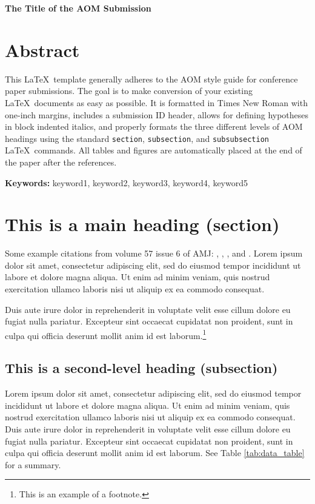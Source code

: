 \documentclass[12pt,letterpaper]{article}
\renewcommand{\title}[1]{
  	\centerline{\textbf{#1}}
  }
\begin{document}
\title{The Title of the AOM Submission}

\section{Abstract}
This \LaTeX\ template generally adheres to the AOM style guide for conference paper submissions. The goal is to make conversion of your existing \LaTeX\ documents as easy as possible. It is formatted in Times New Roman with one-inch margins, includes a submission ID header, allows for defining hypotheses in block indented italics, and properly formats the three different levels of AOM headings using the standard \texttt{section},  \texttt{subsection}, and  \texttt{subsubsection} \LaTeX\ commands. All tables and figures are automatically placed at the end of the paper after the references.

\noindent\textbf{Keywords:} keyword1, keyword2, keyword3, keyword4, keyword5
\newpage

\section{This is a main heading (section)}
  
Some example citations from volume 57 issue 6 of AMJ:  \citet{9984685620141201}, \citet{9984686620141201}, \citet{9984686520141201}, and \citet{9984685820141201}. Lorem ipsum dolor sit amet, consectetur adipiscing elit, sed do eiusmod tempor incididunt ut labore et dolore magna aliqua. Ut enim ad minim veniam, quis nostrud exercitation ullamco laboris nisi ut aliquip ex ea commodo consequat.

Duis aute irure dolor in reprehenderit in voluptate velit esse cillum dolore eu fugiat nulla pariatur. Excepteur sint occaecat cupidatat non proident, sunt in culpa qui officia deserunt mollit anim id est laborum.\footnote{This is an example of a footnote.}

\subsection{This is a second-level heading (subsection)}

Lorem ipsum dolor sit amet, consectetur adipiscing elit, sed do eiusmod tempor incididunt ut labore et dolore magna aliqua. Ut enim ad minim veniam, quis nostrud exercitation ullamco laboris nisi ut aliquip ex ea commodo consequat. Duis aute irure dolor in reprehenderit in voluptate velit esse cillum dolore eu fugiat nulla pariatur. Excepteur sint occaecat cupidatat non proident, sunt in culpa qui officia deserunt mollit anim id est laborum. See Table \ref{tab:data_table} for a summary.
\end{document}
